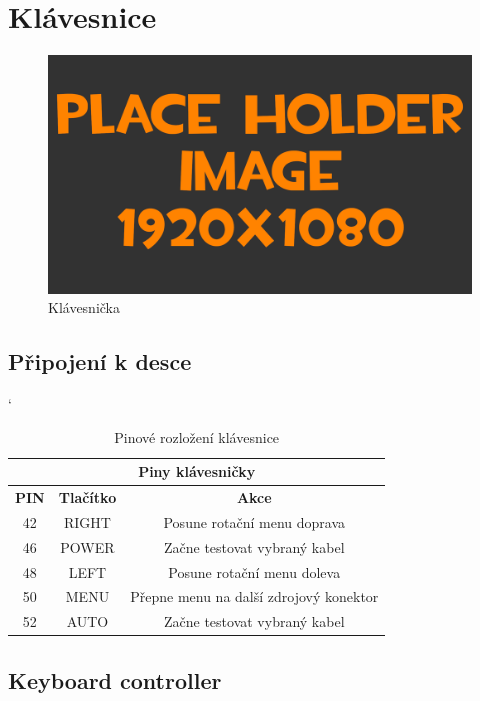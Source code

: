 
\section{Klávesnice}
\begin{figure}[h!]
	\centering
	\includegraphics[width=\textwidth]{pictures/placeHolderFHD.png}
    	\caption{Klávesnička}
   	\label{fig:keyborad}
\end{figure}

\subsection{Připojení k desce}
\begin{table} [h!]
	\centering
	\catcode` %
	\begin{tabular}[c]{|| c | c | c ||}
	\hline
		\multicolumn{3}{||c||}{Piny klávesničky} \\
	\hline
 		 \textbf{PIN} & \textbf{Tlačítko} & \textbf{Akce}\\
	\hline
		42 &  RIGHT & Posune rotační menu doprava\\
	\hline
		46 & POWER &  Začne testovat vybraný kabel\\
	\hline
		48 & LEFT & Posune rotační menu doleva\\
	\hline
		50 & MENU & Přepne menu na další zdrojový konektor \\
	\hline
		52 & AUTO & Začne testovat vybraný kabel\\
	\hline
	\end{tabular}
	\caption{Pinové rozložení klávesnice}
	\label{table:pinKB}
\end{table}

\newpage
\subsection{Keyboard controller}

